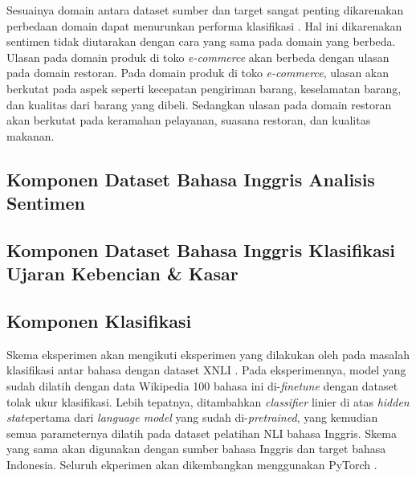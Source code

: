 	Sesuainya domain antara dataset sumber dan target sangat penting dikarenakan perbedaan domain dapat menurunkan performa klasifikasi \parencite{Lai_Oguz_Yang_Stoyanov_2019}. Hal ini dikarenakan sentimen tidak diutarakan dengan cara yang sama pada domain yang berbeda. Ulasan pada domain produk di toko \textit{e-commerce} akan berbeda dengan ulasan pada domain restoran. Pada domain produk di toko \textit{e-commerce}, ulasan akan berkutat pada aspek seperti kecepatan pengiriman barang, keselamatan barang, dan kualitas dari barang yang dibeli. Sedangkan ulasan pada domain restoran akan berkutat pada keramahan pelayanan, suasana restoran, dan kualitas makanan.

	\subsection{Komponen Dataset Bahasa Inggris Analisis Sentimen}
	
	\subsection{Komponen Dataset Bahasa Inggris Klasifikasi Ujaran Kebencian \& Kasar}

	\subsection{Komponen Klasifikasi}
	Skema eksperimen akan mengikuti eksperimen yang dilakukan oleh \parencite{LampleConneau2019} pada masalah klasifikasi antar bahasa dengan dataset XNLI \parencite{Conneau_Rinott_Lample_Williams_Bowman_Schwenk_Stoyanov_2018}. Pada eksperimennya, model yang sudah dilatih dengan data Wikipedia 100 bahasa ini di-\textit{finetune} dengan dataset tolak ukur klasifikasi. Lebih tepatnya, ditambahkan \textit{classifier} linier di atas \textit{hidden state}pertama dari \textit{language model} yang sudah di-\textit{pretrained}, yang kemudian semua parameternya dilatih pada dataset pelatihan NLI bahasa Inggris. Skema yang sama akan digunakan dengan sumber bahasa Inggris dan target bahasa Indonesia. Seluruh ekperimen akan dikembangkan menggunakan PyTorch \parencite{paszke2017automatic}.

